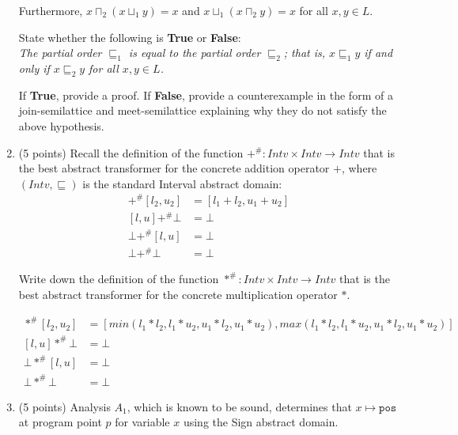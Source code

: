 \documentclass[12pt]{article}
\begin{document}
\begin{enumerate}
Furthermore, $x \sqcap_2 (x \sqcup_1 y) = x$ and $x \sqcup_1 (x \sqcap_2 y) = x$
for all $x, y \in L$. 

State whether the following is \textbf{True} or \textbf{False}:\\
\emph{The partial order $\sqsubseteq_1$ is equal to the partial order $\sqsubseteq_2$; 
that is, $x \sqsubseteq_1 y$ if and only if $x \sqsubseteq_2 y$ for all $x, y \in L$.}

If \textbf{True}, provide a proof. 
If \textbf{False}, provide a counterexample in the form 
of a join-semilattice and meet-semilattice explaining why they do not satisfy 
the above hypothesis.
\begin{mdframed}
  \vspace{2em}
  \end{mdframed}
\emph{}


\item (5 points)
Recall the definition of the function $+^{\#} \colon Intv \times Intv \to Intv$
that is the best abstract transformer for the concrete addition operator $+$,
where $(Intv, \sqsubseteq)$ is the standard Interval abstract domain:
\begin{align*}
  [l_1, u_1] +^{\#} [l_2, u_2] &= [l_1 + l_2, u_1 + u_2] \\
  [l, u] +^{\#} \bot &= \bot \\ 
  \bot +^{\#} [l, u] &= \bot \\ 
  \bot +^{\#} \bot &= \bot 
\end{align*}

Write down the definition of the function $*^{\#} \colon Intv \times Intv \to Intv$
that is the best abstract transformer for the concrete multiplication operator $*$.

\begin{mdframed}
  \begin{align*}
  [l_1, u_1] *^{\#} [l_2, u_2] &= [min(l_1 * l_2, l_1 * u_2, u_1*l_2, u_1*u_2 ), 
  max(l_1 * l_2, l_1 * u_2, u_1*l_2, u_1*u_2 )] \\
  [l, u] *^{\#} \bot &= \bot \\ 
  \bot *^{\#} [l, u] &= \bot \\ 
  \bot *^{\#} \bot &= \bot 
\end{align*}

\end{mdframed}

\newpage

\item  (5 points)
Analysis $A_1$, which is known to be sound, determines that
$x \mapsto \texttt{pos}$ 
at program point $p$ for variable $x$ using the Sign abstract domain. 


\end{enumerate}
\end{document}
